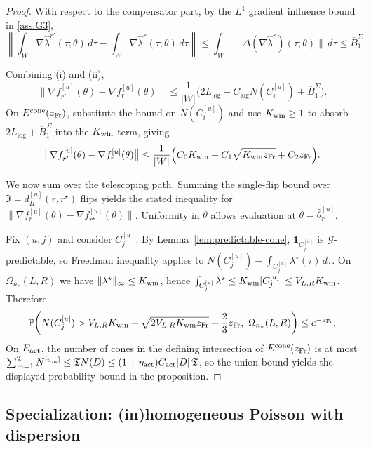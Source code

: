 \documentclass{statsoc}
\newcommand{\1}{\mathbbm{1}}
\newcommand{\Tmax}{\mathfrak{T}}
\begin{document}
\begin{proof}
With respect to the compensator part, by the $L^1$ gradient influence bound in \cref{ass:G3},
\[
\left\|\int_W \nabla\widehat\lambda^{r'}(\tau;\theta)\,d\tau - \int_W \nabla\widehat\lambda^{r}(\tau;\theta)\,d\tau\right\|
\le \int_W \|\Delta(\nabla\widehat\lambda^{r})(\tau;\theta)\|\,d\tau
\le \overline B_1^\Sigma.
\]

Combining (i) and (ii),
\[
\big\|\nabla f_{r'}^{[u]}(\theta)-\nabla f_{r}^{[u]}(\theta)\big\|
\le
\frac{1}{|W|}\Big(2L_{\log}+C_{\log}N(C_{i}^{[u]})+\overline B_1^\Sigma\Big).
\]
On $E^{\rm cone}(z_{\rm Fr})$, substitute the bound on $N(C_i^{[u]})$ and use $K_{\rm win}\ge 1$ to absorb
$2L_{\log}+\overline B_1^\Sigma$ into the $K_{\rm win}$ term, giving
\[
\big\|\nabla f_{r'}^{[u]}(\theta)-\nabla f_{r}^{[u]}(\theta)\big\|
\le
\frac{1}{|W|}\Big(\bar C_0 K_{\rm win} + \bar C_1\sqrt{K_{\rm win} z_{\rm Fr}} + \bar C_2 z_{\rm Fr}\Big).
\]

We now sum over the telescoping path. Summing the single-flip bound over $\mathfrak I=d_H^{[u]}(r,r^\star)$ flips yields the stated inequality for
$\|\nabla f_r^{[u]}(\theta)-\nabla f_{r^\star}^{[u]}(\theta)\|$.
Uniformity in $\theta$ allows evaluation at $\theta=\hat\theta_r^{[u]}$.

Fix $(u,j)$ and consider $C_j^{[u]}$. By Lemma~\ref{lem:predictable-cone},
$\mathbf 1_{C_j^{[u]}}$ is $\mathcal G$-predictable, so Freedman inequality applies to
\(
N(C_j^{[u]})-\int_{C_j^{[u]}}\lambda^\star(\tau)\,d\tau.
\)
On $\Omega_{n_*}(L,R)$ we have $\|\lambda^\star\|_\infty\le K_{\rm win}$, hence
$\int_{C_j^{[u]}}\lambda^\star\le K_{\rm win}|C_j^{[u]}|\le V_{L,R}K_{\rm win}$.
Therefore
\[
\mathbb P\!\left(
N(C_j^{[u]})>V_{L,R}K_{\rm win}+\sqrt{2V_{L,R}K_{\rm win}z_{\rm Fr}}+\frac23 z_{\rm Fr},\ \Omega_{n_*}(L,R)
\right)\le e^{-z_{\rm Fr}}.
\]
On $E_{\rm act}$, the number of cones in the defining intersection of $E^{\rm cone}(z_{\rm Fr})$ is at most
$\sum_{m=1}^{\Tmax} N^{[u_m]}\le \Tmax N(D)\le (1+\eta_{\rm act})C_{\rm act}|D|\,\Tmax$, so the union bound yields
the displayed probability bound in the proposition.
\end{proof}

\subsection{Specialization: (in)homogeneous Poisson with dispersion}\label{sec:apppoisson}
\end{document}
